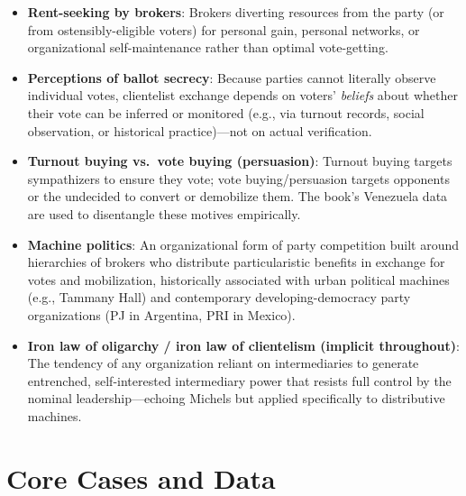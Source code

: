 \documentclass[12pt]{article}
\begin{document}
\begin{itemize}[leftmargin=*, itemsep=4pt]
    \item \textbf{Rent-seeking by brokers}: Brokers diverting resources from the party (or from ostensibly-eligible voters) for personal gain, personal networks, or organizational self-maintenance rather than optimal vote-getting.
    \item \textbf{Perceptions of ballot secrecy}: Because parties cannot literally observe individual votes, clientelist exchange depends on voters' \emph{beliefs} about whether their vote can be inferred or monitored (e.g., via turnout records, social observation, or historical practice)---not on actual verification.
    \item \textbf{Turnout buying vs.\ vote buying (persuasion)}: Turnout buying targets sympathizers to ensure they vote; vote buying/persuasion targets opponents or the undecided to convert or demobilize them. The book's Venezuela data are used to disentangle these motives empirically.
    \item \textbf{Machine politics}: An organizational form of party competition built around hierarchies of brokers who distribute particularistic benefits in exchange for votes and mobilization, historically associated with urban political machines (e.g., Tammany Hall) and contemporary developing-democracy party organizations (PJ in Argentina, PRI in Mexico).
    \item \textbf{Iron law of oligarchy / iron law of clientelism (implicit throughout)}: The tendency of any organization reliant on intermediaries to generate entrenched, self-interested intermediary power that resists full control by the nominal leadership---echoing Michels but applied specifically to distributive machines.
\end{itemize}

\section{Core Cases and Data}
\end{document}
